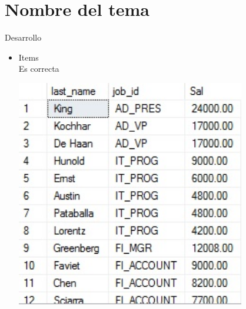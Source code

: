 \section{Nombre del tema} 
Desarrollo

\begin{itemize}
	\item Items
	\\Es correcta
	\begin{center}
	\includegraphics[width=10cm]{./Imagenes/actividad0101} 
	\end{center}



\end{itemize} 